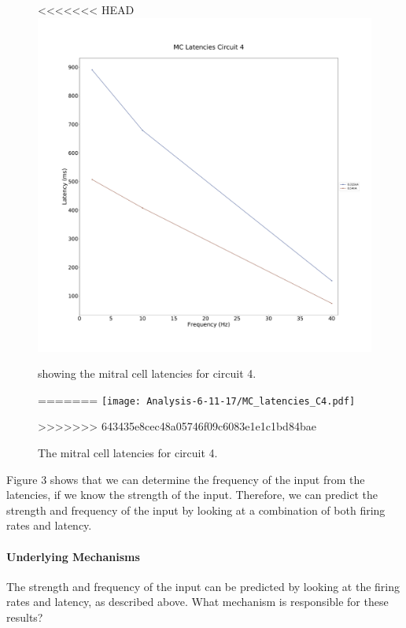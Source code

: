 \documentclass[11pt]{report}
\begin{document}
\begin{figure}[!ht]
\centering
<<<<<<< HEAD
\includegraphics[scale=0.3]{images/2017-11-06/MC_latencies_C4.pdf}
\caption{showing the mitral cell latencies for circuit 4.}
=======
\texttt{[image: Analysis-6-11-17/MC\_latencies\_C4.pdf]}
\caption{The mitral cell latencies for circuit 4.}
>>>>>>> 643435e8cec48a05746f09c6083e1e1c1bd84bae
\end{figure} 

Figure 3 shows that we can determine the frequency of the input from the latencies, if we know the strength of the input. Therefore, we can predict the strength and frequency of the input by looking at a combination of both firing rates and latency.

\paragraph{Underlying Mechanisms}
The strength and frequency of the input can be predicted by looking at the firing rates and latency, as described above. What mechanism is responsible for these results?
\end{document}
